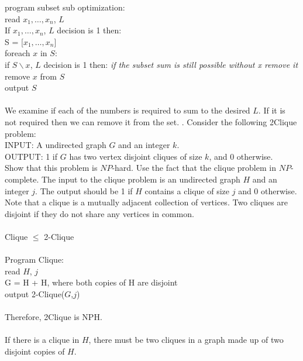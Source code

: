 \documentclass[10pt]{article}
\newcommand{\tab}{\hspace*{2em}}
\newcommand{\tabb}{\hspace*{4em}}
\newcommand{\tabbb}{\hspace*{6em}}
\newcommand{\tabbbb}{\hspace*{8em}}
\begin{document}
		program subset sub optimization:\\
		\tab read $x_1, \ldots, x_n$, $L$\\
		\tab If $x_1, \ldots, x_n$, $L$ decision is 1 then:\\
		\tabb S = [$x_1, \ldots, x_n$]\\ 
		\tabb foreach $x$ in $S$:\\
		\tabbb if $S \backslash x$, $L$ decision is 1 then: \emph{if the subset sum is still possible without x remove it}\\
		\tabbbb remove $x$ from $S$\\
		\tab output $S$\\
		\\
		We examine if each of the numbers is required to sum to the desired $L$. If it is not required then we can remove it 
		from the set.
	. Consider the following 2Clique problem:\\
		INPUT: A undirected graph $G$ and an integer $k$.\\
		OUTPUT: 1 if $G$ has two vertex disjoint cliques of size $k$, and 0 otherwise.\\
		Show that this problem is $NP$-hard. Use the fact that the clique problem in $NP$-complete. The input
		to the clique problem is an undirected graph $H$ and an integer $j$. The output should be 1 if $H$ contains
		a clique of size $j$ and 0 otherwise. Note that a clique is a mutually adjacent collection of vertices. Two
		cliques are disjoint if they do not share any vertices in common.\\
		\\
		Clique $\leq$ 2-Clique\\
		\\
		Program Clique:\\
		\tab read $H$, $j$\\
		\tab G = H + H, where both copies of H are disjoint\\
		\tab output 2-Clique($G$,$j$)\\
		\\
		Therefore, 2Clique is NPH.\\
		\\
		If there is a clique in $H$, there must be two cliques in a graph made up of two disjoint copies of $H$.
\end{document}

